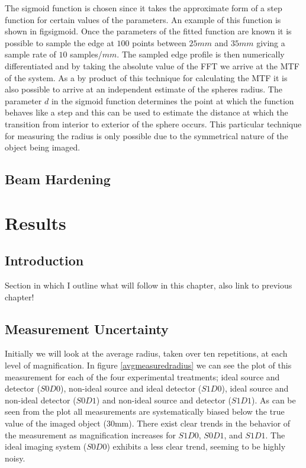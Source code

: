 \documentclass[
  twoside,
  11pt, a4paper,
  footinclude=true,
  headinclude=true,
  cleardoublepage=empty
]{scrbook}
\begin{document}
The sigmoid function is chosen since it takes the approximate form of a step function for certain values of the parameters. An example of this function is shown in fig{sigmoid}. Once the parameters of the fitted function are known it is possible to sample the edge at $100$ points between $25mm$ and $35mm$ giving a sample rate of $10$ samples/$mm$. The sampled edge profile is then numerically differentiated and by taking the absolute value of the FFT we arrive at the MTF of the system. As a by product of this technique for calculating the MTF it is also possible to arrive at an independent estimate of the spheres radius. The parameter $d$ in the sigmoid function determines the point at which the function behaves like a step and this can be used to estimate the distance at which the transition from interior to exterior of the sphere occurs. This particular technique for measuring the radius is only possible due to the symmetrical nature of the object being imaged.










\section{Beam Hardening}
\chapter{Results}

\section{Introduction}

Section in which I outline what will follow in this chapter, also link to previous chapter!

\section{Measurement Uncertainty}

Initially we will look at the average radius, taken over ten repetitions, at each level of magnification. In figure \ref{avgmeasuredradius} we can see the plot of this measurement for each of the four experimental treatments; ideal source and detector ($S0D0$), non-ideal source and ideal detector ($S1D0$), ideal source and non-ideal detector ($S0D1$) and non-ideal source and detector ($S1D1$). As can be seen from the plot all measurements are systematically biased below the true value of the imaged object (30mm). There exist clear trends in the behavior of the measurement as magnification increases for $S1D0$, $S0D1$, and $S1D1$. The ideal imaging system ($S0D0$) exhibits a less clear trend, seeming to be highly noisy.
\end{document}
